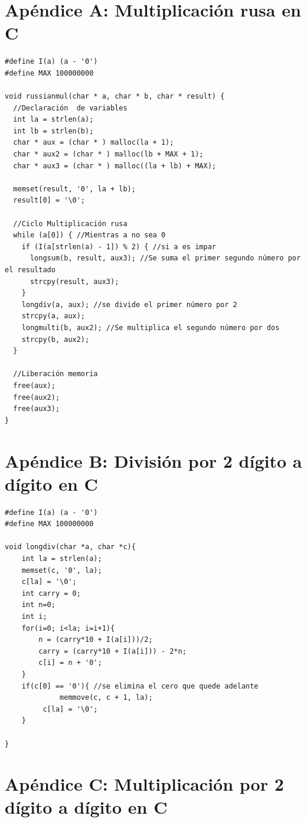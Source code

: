 \documentclass[10pt,journal,compsoc]{IEEEtran}
\begin{document}

\onecolumn 

\appendix

\section*{Apéndice A: Multiplicación rusa en C}

\begin{verbatim}
#define I(a) (a - '0')
#define MAX 100000000

void russianmul(char * a, char * b, char * result) {
  //Declaración  de variables
  int la = strlen(a);
  int lb = strlen(b);
  char * aux = (char * ) malloc(la + 1);
  char * aux2 = (char * ) malloc(lb + MAX + 1);
  char * aux3 = (char * ) malloc((la + lb) + MAX);

  memset(result, '0', la + lb);
  result[0] = '\0';

  //Ciclo Multiplicación rusa
  while (a[0]) { //Mientras a no sea 0
    if (I(a[strlen(a) - 1]) % 2) { //si a es impar
      longsum(b, result, aux3); //Se suma el primer segundo número por el resultado
      strcpy(result, aux3);
    }
    longdiv(a, aux); //se divide el primer número por 2
    strcpy(a, aux);
    longmulti(b, aux2); //Se multiplica el segundo número por dos
    strcpy(b, aux2);
  }

  //Liberación memoria
  free(aux);
  free(aux2);
  free(aux3);
}
\end{verbatim}


\section*{Apéndice B: División por 2 dígito a dígito en C}

\begin{verbatim}
#define I(a) (a - '0')
#define MAX 100000000

void longdiv(char *a, char *c){
    int la = strlen(a);
    memset(c, '0', la);
    c[la] = '\0';
    int carry = 0;
    int n=0;
    int i;
    for(i=0; i<la; i=i+1){
        n = (carry*10 + I(a[i]))/2; 
        carry = (carry*10 + I(a[i])) - 2*n;
        c[i] = n + '0';
    }
    if(c[0] == '0'){ //se elimina el cero que quede adelante
  			 memmove(c, c + 1, la);
  	     c[la] = '\0';
    }

}
\end{verbatim}

\section*{Apéndice C: Multiplicación por 2 dígito a dígito en C}
\end{document}
